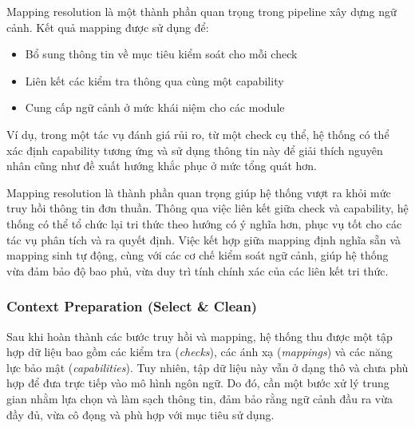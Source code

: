 \begin{enumerate}
    Mapping resolution là một thành phần quan trọng trong pipeline xây dựng ngữ cảnh. Kết quả mapping được sử dụng để:
    \begin{itemize}
        \item Bổ sung thông tin về mục tiêu kiểm soát cho mỗi check
        \item Liên kết các kiểm tra thông qua cùng một capability
        \item Cung cấp ngữ cảnh ở mức khái niệm cho các module
    \end{itemize}

    Ví dụ, trong một tác vụ đánh giá rủi ro, từ một check cụ thể, hệ thống có thể xác định capability tương ứng và sử dụng thông tin này để giải thích nguyên nhân cũng như đề xuất hướng khắc phục ở mức tổng quát hơn.

\end{enumerate}

Mapping resolution là thành phần quan trọng giúp hệ thống vượt ra khỏi mức truy hồi thông tin đơn thuần. Thông qua việc liên kết giữa check và capability, hệ thống có thể tổ chức lại tri thức theo hướng có ý nghĩa hơn, phục vụ tốt cho các tác vụ phân tích và ra quyết định. Việc kết hợp giữa mapping định nghĩa sẵn và mapping sinh tự động, cùng với các cơ chế kiểm soát ngữ cảnh, giúp hệ thống vừa đảm bảo độ bao phủ, vừa duy trì tính chính xác của các liên kết tri thức.



\subsubsection*{Context Preparation (Select \& Clean)}

Sau khi hoàn thành các bước truy hồi và mapping, hệ thống thu được một tập hợp dữ liệu bao gồm các kiểm tra (\textit{checks}), các ánh xạ (\textit{mappings}) và các năng lực bảo mật (\textit{capabilities}). Tuy nhiên, tập dữ liệu này vẫn ở dạng thô và chưa phù hợp để đưa trực tiếp vào mô hình ngôn ngữ. Do đó, cần một bước xử lý trung gian nhằm lựa chọn và làm sạch thông tin, đảm bảo rằng ngữ cảnh đầu ra vừa đầy đủ, vừa cô đọng và phù hợp với mục tiêu sử dụng.

